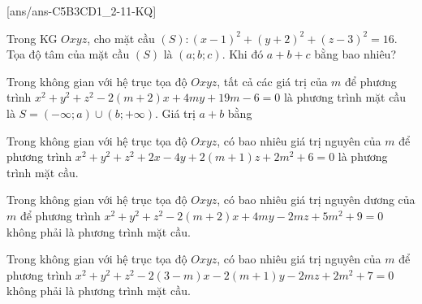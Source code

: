[ans/ans-C5B3CD1_2-11-KQ]
\TNSA
\begin{ex}%
	Trong KG $Oxyz$, cho mặt cầu $(S)\colon (x-1)^2+(y+2)^2+(z-3)^2=16$. Tọa độ tâm của mặt cầu $(S)$ là $(a;b;c)$. Khi đó $a+b+c$ bằng bao nhiêu?
\end{ex}
\begin{ex}%
	Trong không gian với hệ trục tọa độ $Oxyz$, tất cả các giá trị của $m$ để phương trình $x^2+y^2+z^2-2(m+2)x+4my+19m-6=0$ là phương trình mặt cầu là $S=(-\infty;a)\cup(b;+\infty)$. Giá trị $a+b$ bằng
\end{ex}
\begin{ex}%
	Trong không gian với hệ trục tọa độ $Oxyz$, có bao nhiêu giá trị nguyên của $m$ để phương trình $x^2+y^2+z^2+2x-4y+2(m+1)z+2m^2+6=0$ là phương trình mặt cầu.
\end{ex}
\begin{ex}%
	Trong không gian với hệ trục tọa độ $Oxyz$, có bao nhiêu giá trị nguyên dương của $m$ để phương trình $x^2+y^2+z^2-2(m+2)x+4my-2mz+5m^2+9=0$ không phải là phương trình mặt cầu.
\end{ex}
\begin{ex}%
	Trong không gian với hệ trục tọa độ $Oxyz$, có bao nhiêu giá trị nguyên của $m$ để phương trình $x^2+y^2+z^2-2(3-m)x-2(m+1)y-2mz+2m^2+7=0$ không phải là phương trình mặt cầu.
\end{ex}
